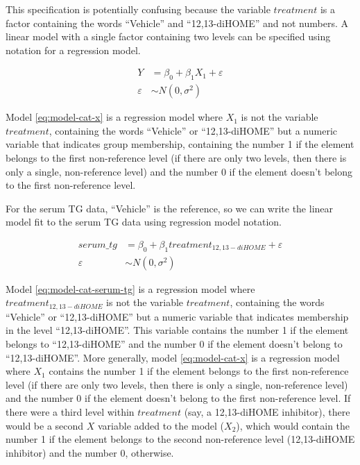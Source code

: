 \documentclass[]{book}
\begin{document}
This specification is potentially confusing because the variable \(treatment\) is a factor containing the words ``Vehicle'' and ``12,13-diHOME'' and not numbers. A linear model with a single factor containing two levels can be specified using notation for a regression model.

\begin{align}
Y &= \beta_0 + \beta_1 X_1 + \varepsilon\\
\varepsilon &\sim N(0, \sigma^2)
\label{eq:model-cat-x}
\end{align}

Model \eqref{eq:model-cat-x} is a regression model where \(X_1\) is not the variable \(treatment\), containing the words ``Vehicle'' or ``12,13-diHOME'' but a numeric variable that indicates group membership, containing the number 1 if the element belongs to the first non-reference level (if there are only two levels, then there is only a single, non-reference level) and the number 0 if the element doesn't belong to the first non-reference level.

For the serum TG data, ``Vehicle'' is the reference, so we can write the linear model fit to the serum TG data using regression model notation.

\begin{align}
serum\_tg &= \beta_0 + \beta_1 treatment_{12,13-diHOME} + \varepsilon\\
\varepsilon &\sim N(0, \sigma^2)
\label{eq:model-cat-serum-tg}
\end{align}

Model \eqref{eq:model-cat-serum-tg} is a regression model where \(treatment_{12,13-diHOME}\) is not the variable \(treatment\), containing the words ``Vehicle'' or ``12,13-diHOME'' but a numeric variable that indicates membership in the level ``12,13-diHOME''. This variable contains the number 1 if the element belongs to ``12,13-diHOME'' and the number 0 if the element doesn't belong to ``12,13-diHOME''. More generally, model \eqref{eq:model-cat-x} is a regression model where \(X_1\) contains the number 1 if the element belongs to the first non-reference level (if there are only two levels, then there is only a single, non-reference level) and the number 0 if the element doesn't belong to the first non-reference level. If there were a third level within \(treatment\) (say, a 12,13-diHOME inhibitor), there would be a second \(X\) variable added to the model (\(X_2\)), which would contain the number 1 if the element belongs to the second non-reference level (12,13-diHOME inhibitor) and the number 0, otherwise.
\end{document}
